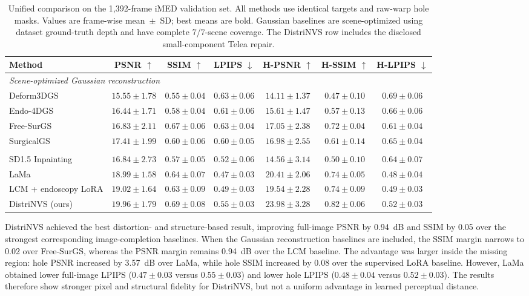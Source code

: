 \documentclass[letterpaper,10pt,conference]{ieeeconf}
\begin{document}
\begin{table}[t]
\centering
\caption{Unified comparison on the 1,392-frame iMED validation set. All methods
use identical targets and raw-warp hole masks. Values are frame-wise
mean~$\pm$~SD; best means are bold. Gaussian baselines are scene-optimized
using dataset ground-truth depth and have complete 7/7-scene coverage. The
DistriNVS row includes the disclosed small-component Telea repair.}
\label{tab:validation-comparison}
\setlength{\tabcolsep}{3.5pt}
\begin{tabular}{lcccccc}
\toprule
Method & PSNR $\uparrow$ & SSIM $\uparrow$ & LPIPS $\downarrow$ &
H-PSNR $\uparrow$ & H-SSIM $\uparrow$ & H-LPIPS $\downarrow$ \\
\midrule
\multicolumn{7}{l}{\textit{Scene-optimized Gaussian reconstruction}} \\
Deform3DGS~\cite{yang2024deform3dgs} & $15.55\pm1.78$ & $0.55\pm0.04$ &
$0.63\pm0.06$ & $14.11\pm1.37$ & $0.47\pm0.10$ & $0.69\pm0.06$ \\
Endo-4DGS~\cite{huang2024endo4dgs} & $16.44\pm1.71$ & $0.58\pm0.04$ &
$0.61\pm0.06$ & $15.61\pm1.47$ & $0.57\pm0.13$ & $0.66\pm0.06$ \\
Free-SurGS~\cite{guo2024freesurgs} & $16.83\pm2.11$ & $0.67\pm0.06$ &
$0.63\pm0.04$ & $17.05\pm2.38$ & $0.72\pm0.04$ & $0.61\pm0.04$ \\
SurgicalGS~\cite{chen2025surgicalgs} & $17.41\pm1.99$ & $0.60\pm0.06$ &
$0.60\pm0.05$ & $16.98\pm2.55$ & $0.61\pm0.14$ & $0.65\pm0.04$ \\
\addlinespace
\multicolumn{7}{l}{\textit{Image completion}} \\
SD1.5 Inpainting & $16.84\pm2.73$ & $0.57\pm0.05$ & $0.52\pm0.06$ &
$14.56\pm3.14$ & $0.50\pm0.10$ & $0.64\pm0.07$ \\
LaMa & $18.99\pm1.58$ & $0.64\pm0.07$ & $\mathbf{0.47\pm0.03}$ &
$20.41\pm2.06$ & $0.74\pm0.05$ & $\mathbf{0.48\pm0.04}$ \\
LCM + endoscopy LoRA & $19.02\pm1.64$ & $0.63\pm0.09$ & $0.49\pm0.03$ &
$19.54\pm2.28$ & $0.74\pm0.09$ & $0.49\pm0.03$ \\
\midrule
DistriNVS (ours) & $\mathbf{19.96\pm1.79}$ & $\mathbf{0.69\pm0.08}$ &
$0.55\pm0.03$ & $\mathbf{23.98\pm3.28}$ & $\mathbf{0.82\pm0.06}$ &
$0.52\pm0.03$ \\
\bottomrule
\end{tabular}
\end{table}

DistriNVS achieved the best distortion- and structure-based result, improving
full-image PSNR by 0.94~dB and SSIM by 0.05 over the strongest corresponding
image-completion baselines. When the Gaussian reconstruction baselines are included, the SSIM
margin narrows to 0.02 over Free-SurGS, whereas the PSNR margin remains
0.94~dB over the LCM baseline. The advantage was larger inside the missing region: hole PSNR
increased by 3.57~dB over LaMa, while hole SSIM increased by 0.08 over the
supervised LoRA baseline. However, LaMa obtained lower full-image LPIPS
($0.47\pm0.03$ versus $0.55\pm0.03$) and lower hole LPIPS
($0.48\pm0.04$ versus $0.52\pm0.03$). The results therefore show stronger
pixel and structural fidelity for DistriNVS, but not a uniform advantage in
learned perceptual distance.
\end{document}
